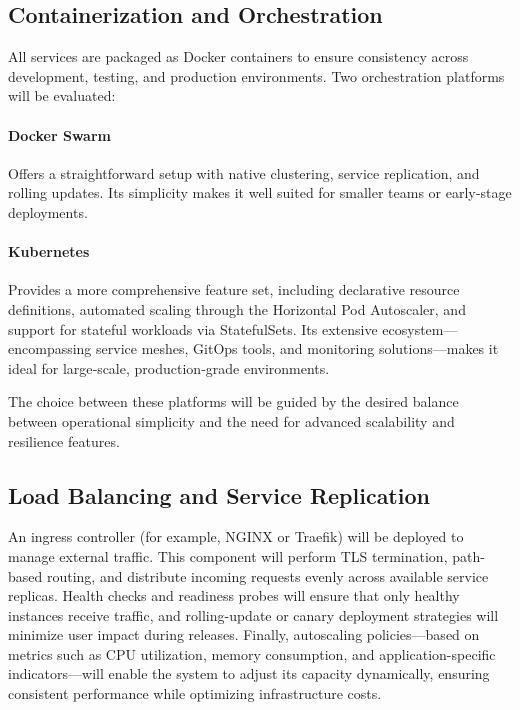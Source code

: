 \subsection{Containerization and Orchestration}

All services are packaged as Docker containers to ensure consistency across development, testing, and production environments. Two orchestration platforms will be evaluated:

\paragraph{Docker Swarm}  
Offers a straightforward setup with native clustering, service replication, and rolling updates. Its simplicity makes it well suited for smaller teams or early‐stage deployments.

\paragraph{Kubernetes}  
Provides a more comprehensive feature set, including declarative resource definitions, automated scaling through the Horizontal Pod Autoscaler, and support for stateful workloads via StatefulSets. Its extensive ecosystem—encompassing service meshes, GitOps tools, and monitoring solutions—makes it ideal for large‐scale, production‐grade environments.

The choice between these platforms will be guided by the desired balance between operational simplicity and the need for advanced scalability and resilience features.

\subsection{Load Balancing and Service Replication}

An ingress controller (for example, NGINX or Traefik) will be deployed to manage external traffic. This component will perform TLS termination, path-based routing, and distribute incoming requests evenly across available service replicas. Health checks and readiness probes will ensure that only healthy instances receive traffic, and rolling-update or canary deployment strategies will minimize user impact during releases. Finally, autoscaling policies—based on metrics such as CPU utilization, memory consumption, and application-specific indicators—will enable the system to adjust its capacity dynamically, ensuring consistent performance while optimizing infrastructure costs.  
